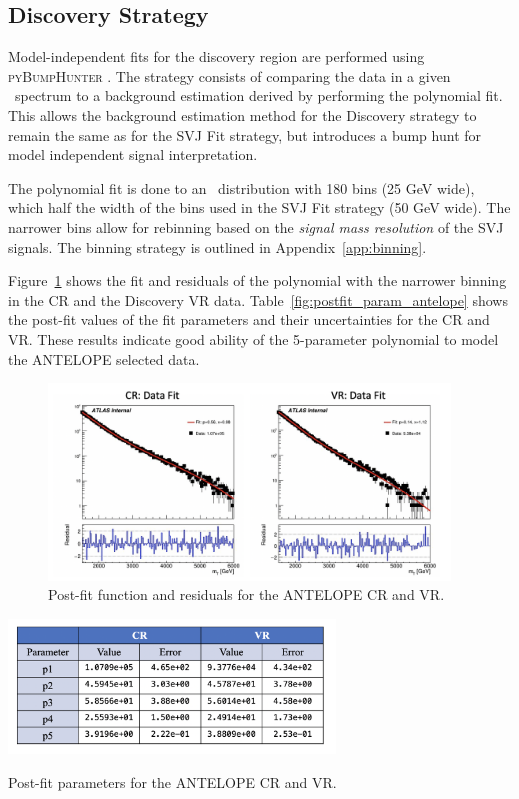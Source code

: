 \subsection{Discovery Strategy}
\label{subsec:fit_bh}

Model-independent fits for the discovery region are performed using \textsc{pyBumpHunter} \cite{bumphunt}.
The strategy consists of comparing the data in a given \mt~spectrum to a background estimation derived by performing the polynomial fit.
This allows the background estimation method for the Discovery strategy to remain the same as for the SVJ Fit strategy, but introduces a bump hunt for model independent signal interpretation. 

The polynomial fit is done to an \mt~distribution with 180 bins (25 GeV wide), which half the width of the bins used in the SVJ Fit strategy (50 GeV wide). %
The narrower bins allow for rebinning based on the \textit{signal mass resolution} of the SVJ signals.
The binning strategy is outlined in Appendix~\ref{app:binning}.

Figure~\ref{fig:bkgfit_data_crvr_antelope} shows the fit and residuals of the polynomial with the narrower binning in the CR and the Discovery VR data.
Table~\ref{fig:postfit_param_antelope} shows the post-fit values of the fit parameters and their uncertainties for the CR and VR. 
These results indicate good ability of the 5-parameter polynomial to model the ANTELOPE selected data.

\begin{figure}[!htbp]
\centering
   \includegraphics[width=0.95\textwidth]{figures/stats/bkgfit_data_crvr_antelope}
    \caption{Post-fit function and residuals for the ANTELOPE CR and VR.
    \label{fig:bkgfit_data_crvr_antelope}}
\end{figure}

\begin{table}[!htbp]
\centering
   \includegraphics[width=0.65\textwidth]{figures/stats/postfit_param_antelope}
    \caption{Post-fit parameters for the ANTELOPE CR and VR.
    \label{fig:postfit_param_antelope}}
\end{table}

